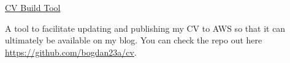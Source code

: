 \cventry
    {\href{https://github.com/bogdan23a/cv}{CV Build Tool}} %
    {} %
    {} %
    {} %
    {\begin{cvitems}
         \item{A tool to facilitate updating and publishing my CV to AWS so that it can ultimately be available on my blog.
         You can check the repo out here \href{https://github.com/bogdan23a/cv}{https://github.com/bogdan23a/cv}.}
    \end{cvitems}}